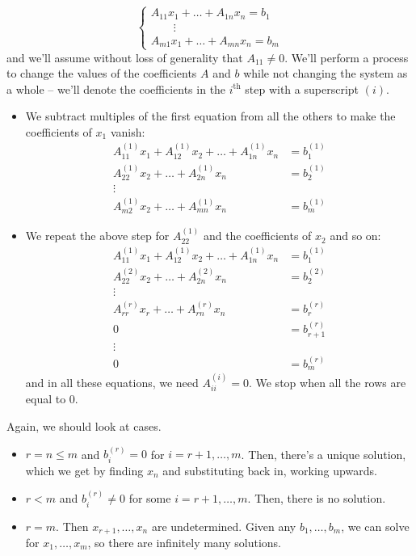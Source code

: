 \documentclass{../../template/note}
\begin{document}
    \[
        \begin{cases}
            A_{11}x_1 + \dots + A_{1n}x_n = b_1 \\
            \qquad \vdots \\
            A_{m1}x_1 + \dots + A_{mn}x_n = b_m
        \end{cases}
    \]
    and we'll assume without loss of generality that \(A_{11} \neq 0\). We'll perform a process to change the values of the coefficients \(A\) and \(b\) while not changing the system as a whole -- we'll denote the coefficients in the \(i^\text{th}\) step with a superscript \((i)\).
    \begin{itemize}
        \item We subtract multiples of the first equation from all the others to make the coefficients of \(x_1\) vanish:
        \begin{align*}
            A_{11}^{(1)}x_1 + A_{12}^{(1)}x_2 + \dots + A_{1n}^{(1)}x_n &= b_1^{(1)} \\
            A_{22}^{(1)}x_2 + \dots + A_{2n}^{(1)}x_n &= b_2^{(1)} \\
            \vdots \\
            A_{m2}^{(1)}x_2 + \dots + A_{mn}^{(1)}x_n &= b_m^{(1)}
        \end{align*}
        \item We repeat the above step for \(A_{22}^{(1)}\) and the coefficients of \(x_2\) and so on:
        \begin{align*}
            A_{11}^{(1)}x_1 + A_{12}^{(1)}x_2 + \dots + A_{1n}^{(1)}x_n &= b_1^{(1)} \\
            A_{22}^{(2)}x_2 + \dots + A_{2n}^{(2)}x_n &= b_2^{(2)} \\ 
            \vdots \\
            A_{rr}^{(r)}x_r + \dots + A_{rn}^{(r)}x_n &= b_r^{(r)} \\
            0 &= b_{r+1}^{(r)} \\
            \vdots \\
            0 &= b_m^{(r)}
        \end{align*}
        and in all these equations, we need \(A_{ii}^{(i)} = 0\). We stop when all the rows are equal to 0.
    \end{itemize}
    Again, we should look at cases.
    \begin{itemize}
        \item \(r = n \leq m\) and \(b_i^{(r)} = 0\) for \(i = r+1, \dots, m\). Then, there's a unique solution, which we get by finding \(x_n\) and substituting back in, working upwards.
        \item \(r < m\) and \(b_i^{(r)} \neq 0\) for some \(i = r+1, \dots, m\). Then, there is no solution.
        \item \(r = m\). Then \(x_{r+1}, \dots, x_n\) are undetermined. Given any \(b_1, \dots, b_m\), we can solve for \(x_1, \dots, x_m\), so there are infinitely many solutions. 
    \end{itemize}
\end{document}

